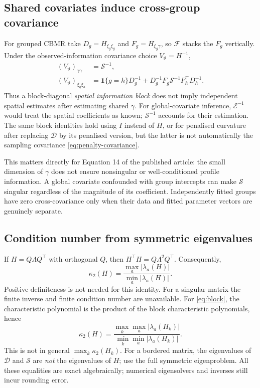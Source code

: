 \documentclass[11pt,a4paper]{article}
\numberwithin{equation}{section}
\begin{document}
\subsection{Shared covariates induce cross-group covariance}\label{sec:shared}
For grouped CBMR take $D_g=H_{\xi_g\xi_g}$ and
$F_g=H_{\xi_g\gamma}$, so $\mathcal F$ stacks the $F_g$ vertically.
Under the observed-information covariance choice $V_\vartheta=H^{-1}$,
\begin{align}\label{eq:shared-covariance}
 (V_\vartheta)_{\gamma\gamma}&=\mathcal S^{-1},\\
 (V_\vartheta)_{\xi_g\xi_h}
 &=\mathbf1\{g=h\}D_g^{-1}
       +D_g^{-1}F_g\mathcal S^{-1}F_h^\top D_h^{-1}.
\end{align}
Thus a block-diagonal \emph{spatial information block} does not imply
independent spatial estimates after estimating shared $\gamma$.
For global-covariate inference, $\mathcal E^{-1}$ would treat the spatial
coefficients as known; $\mathcal S^{-1}$ accounts for their estimation.
The same block identities hold using $I$ instead of $H$, or for penalised
curvature after replacing $\mathcal D$ by its penalised version, but the
latter is not automatically the sampling covariance
\eqref{eq:penalty-covariance}.

This matters directly for Equation 14 of the published article: the small
dimension of $\gamma$ does not ensure nonsingular or well-conditioned
profile information. A global covariate confounded with group intercepts
can make $\mathcal S$ singular regardless of the magnitude of its
coefficient. Independently fitted groups have zero cross-covariance only
when their data and fitted parameter vectors are genuinely separate.

\subsection{Condition number from symmetric eigenvalues}
If $H=Q\Lambda Q^\top$ with orthogonal $Q$, then
$H^\top H=Q\Lambda^2Q^\top$. Consequently,
\begin{equation}\label{eq:condition}
 \kappa_2(H)=\frac{\max_a|\lambda_a(H)|}{\min_a|\lambda_a(H)|}.
\end{equation}
Positive definiteness is not needed for this identity. For a singular matrix
the finite inverse and finite condition number are unavailable.
For \eqref{eq:block}, the characteristic polynomial is the product of the
block characteristic polynomials, hence
\[
 \kappa_2(H)=
 \frac{\max_k\max_a|\lambda_a(H_k)|}
      {\min_k\min_a|\lambda_a(H_k)|}.
\]
This is not in general $\max_k\kappa_2(H_k)$.
For a bordered matrix, the eigenvalues of $\mathcal D$ and $\mathcal S$ are
\emph{not} the eigenvalues of $H$; use the full symmetric eigenproblem.
All these equalities are exact algebraically; numerical eigensolvers and
inverses still incur rounding error.
\end{document}
